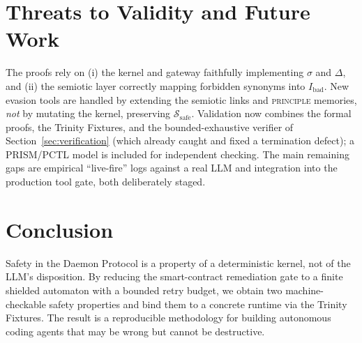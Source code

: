 \documentclass{article}
\theoremstyle{plain}
\theoremstyle{definition}
\begin{document}
\section{Threats to Validity and Future Work}
The proofs rely on (i) the kernel and gateway faithfully implementing
$\sigma$ and $\Delta$, and (ii) the semiotic layer correctly mapping forbidden
synonyms into $I_{\text{bad}}$. New evasion tools are handled by extending the
semiotic links and \textsc{principle} memories, \emph{not} by mutating the
kernel, preserving $\mathcal{S}_{\text{safe}}$. Validation now combines the
formal proofs, the Trinity Fixtures, and the bounded-exhaustive verifier of
Section~\ref{sec:verification} (which already caught and fixed a termination
defect); a PRISM/PCTL model is included for independent checking. The main
remaining gaps are empirical ``live-fire'' logs against a real LLM and
integration into the production tool gate, both deliberately staged.

\section{Conclusion}
Safety in the Daemon Protocol is a property of a deterministic kernel, not of the
LLM's disposition. By reducing the smart-contract remediation gate to a finite
shielded automaton with a bounded retry budget, we obtain two machine-checkable
safety properties and bind them to a concrete runtime via the Trinity Fixtures.
The result is a reproducible methodology for building autonomous coding agents
that may be wrong but cannot be destructive.
\end{document}
